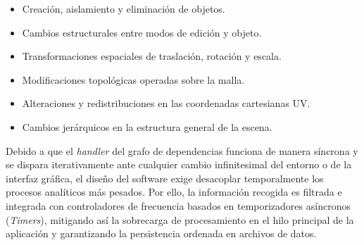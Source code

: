 \begin{itemize}
\item Creación, aislamiento y eliminación de objetos.
\item Cambios estructurales entre modos de edición y objeto.
\item Transformaciones espaciales de traslación, rotación y escala.
\item Modificaciones topológicas operadas sobre la malla.
\item Alteraciones y redistribuciones en las coordenadas cartesianas UV.
\item Cambios jerárquicos en la estructura general de la escena.
\end{itemize}

Debido a que el \textit{handler} del grafo de dependencias funciona de manera síncrona y se dispara iterativamente ante cualquier cambio infinitesimal del entorno o de la interfaz gráfica, el diseño del software exige desacoplar temporalmente los procesos analíticos más pesados. Por ello, la información recogida es filtrada e integrada con controladores de frecuencia basados en temporizadores asíncronos (\textit{Timers}), mitigando así la sobrecarga de procesamiento en el hilo principal de la aplicación y garantizando la persistencia ordenada en archivos de datos.